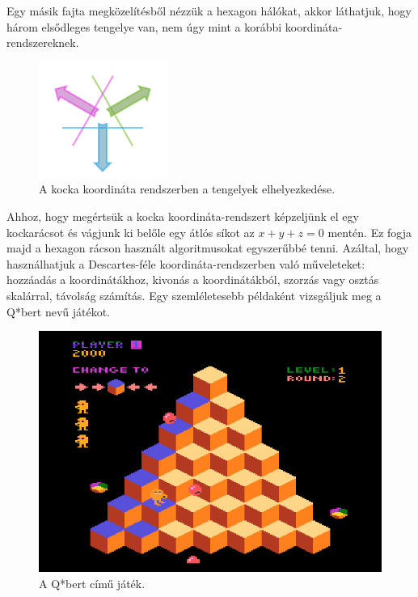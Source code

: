 Egy másik fajta megközelítésből nézzük a hexagon hálókat, akkor láthatjuk, hogy három elsődleges tengelye van, nem úgy mint a korábbi koordináta-rendszereknek. 

\begin{figure}[h]
\centering
\includegraphics[scale=0.3]{kepek/img43.png}
\caption{A kocka koordináta rendszerben a tengelyek elhelyezkedése.}
\label{fig:img43}
\end{figure}

\noindent Ahhoz, hogy megértsük a kocka koordináta-rendszert képzeljünk el egy kockarácsot és vágjunk ki belőle egy átlós síkot az $x + y + z = 0$ mentén. Ez fogja majd a hexagon rácson használt algoritmusokat egyszerűbbé tenni. Azáltal, hogy használhatjuk a Descartes-féle koordináta-rendszerben való műveleteket: hozzáadás a koordinátákhoz, kivonás a koordinátákból, szorzás vagy osztás skalárral, távolság számítás.
\newline
\newline Egy szemléletesebb példaként vizsgáljuk meg a Q*bert nevű játékot.

\begin{figure}[h]
\centering
\includegraphics[scale=0.3]{kepek/img44.png}
\caption{A Q*bert című játék.}
\label{fig:img44}
\end{figure}


